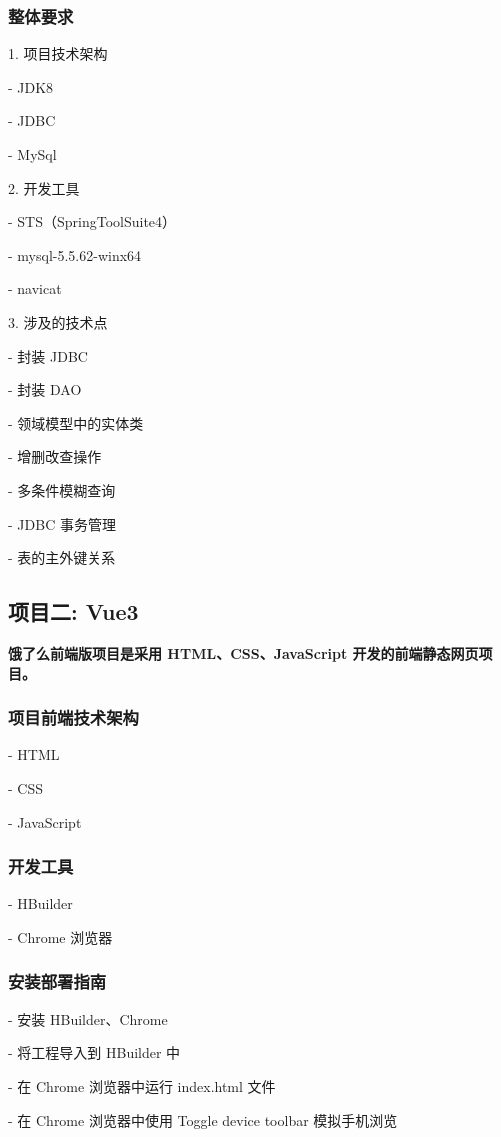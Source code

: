 \subsubsection{整体要求}
1. 项目技术架构

   - JDK8
   
   - JDBC
   
   - MySql
   
2. 开发工具

   - STS（SpringToolSuite4）
   
   - mysql-5.5.62-winx64
   
   - navicat
   
3. 涉及的技术点

   - 封装 JDBC

   - 封装 DAO

   - 领域模型中的实体类
   
   - 增删改查操作

   - 多条件模糊查询

   - JDBC 事务管理
   
   - 表的主外键关系
   

   
\subsection{项目二: Vue3}
\textbf{饿了么前端版项目是采用 HTML、CSS、JavaScript 开发的前端静态网页项目。}

\subsubsection{项目前端技术架构}
- HTML

- CSS

- JavaScript


\subsubsection{开发工具}
- HBuilder

- Chrome 浏览器


\subsubsection{安装部署指南}
- 安装 HBuilder、Chrome

- 将工程导入到 HBuilder 中

- 在 Chrome 浏览器中运行 index.html 文件

- 在 Chrome 浏览器中使用 Toggle device toolbar 模拟手机浏览

